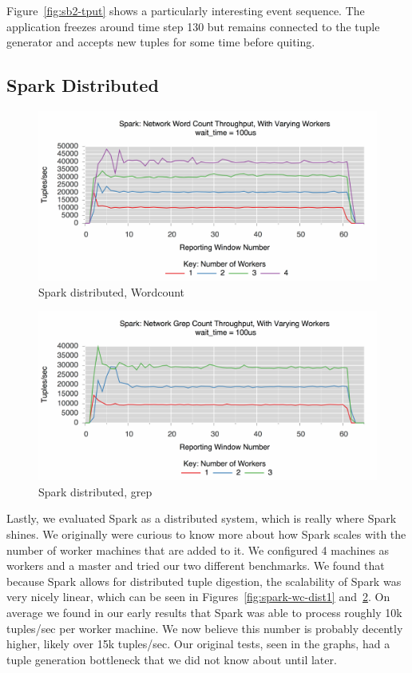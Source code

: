 Figure~\ref{fig:sb2-tput} shows a particularly interesting event sequence. The 
application freezes around time step 130 but remains connected to the tuple generator
and accepts new tuples for some time before quiting.

\subsection{Spark Distributed}
\label{ssec:spark-dist1}

\begin{figure}[t]
\centering
\includegraphics[width=1\linewidth]{figures/spark-wc-dist.pdf}
\caption{Spark distributed, Wordcount}
\label{fig:spark-wc-dist}
\end{figure}


\begin{figure}[t]
\centering
\includegraphics[width=1\linewidth]{figures/spark-grep-dist.pdf}
\caption{Spark distributed, grep}
\label{fig:spark-grep-dist}
\end{figure}

Lastly, we evaluated Spark as a distributed system, which is really where Spark shines. We originally were curious to know more about how Spark scales with the number of worker machines that are added to it. We configured 4 machines as workers and a master and tried our two different benchmarks. We found that because Spark allows for distributed tuple digestion, the scalability of Spark was very nicely linear, which can be seen in Figures~\ref{fig:spark-wc-dist1} and~\ref{fig:spark-grep-dist}. On average we found in our early results that Spark was able to process roughly 10k tuples/sec per worker machine. We now believe this number is probably decently higher, likely over 15k tuples/sec. Our original tests, seen in the graphs, had a tuple generation bottleneck that we did not know about until later.


